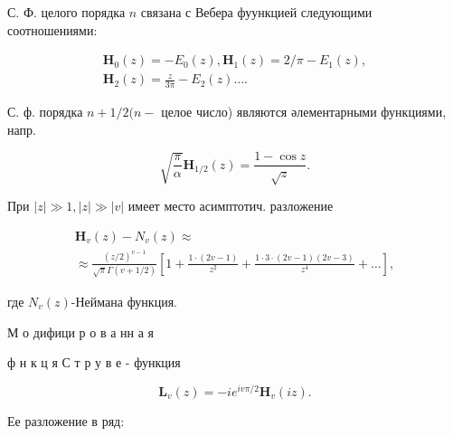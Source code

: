 \documentclass[10pt]{article}
\begin{document}
С. Ф. целого порядка $n$ связана с Вебера фуункцией следующими соотношениями:



\[

\begin{gathered}

\mathbf{H}_{0}(z)=-E_{0}(z), \mathbf{H}_{1}(z)=2 / \pi-E_{1}(z), \\

\mathbf{H}_{2}(z)=\frac{z}{3 \pi}-E_{2}(z) \ldots .

\end{gathered}

\]



С. ф. порядка $n+1 / 2(n-$ целое число) являются әлементарными функциями, напр.



\[

\sqrt{\frac{\pi}{\alpha}} \mathbf{H}_{1 / 2}(z)=\frac{1-\cos z}{\sqrt{z}} .

\]



При $|z| \gg 1,|z| \gg|v|$ имеет место асимптотич. разложение



\[

\begin{gathered}

\mathbf{H}_{v}(z)-N_{v}(z) \approx \\

\approx \frac{(z / 2)^{v-1}}{\sqrt{\pi} \Gamma(v+1 / 2)}\left[1+\frac{1 \cdot(2 v-1)}{z^{2}}+\frac{1 \cdot 3 \cdot(2 v-1)(2 v-3)}{z^{4}}+\ldots\right],

\end{gathered}

\]



где $N_{v}(z)$-Неймана функция.



М о дифици р о в а нн а я



ф $\mathbf{н}$ к ц я С т р у в е - функция



\[

\mathbf{L}_{v}(z)=-i e^{i v \pi / 2} \mathbf{H}_{v}(i z) .

\]



Ее разложение в ряд:
\end{document}
